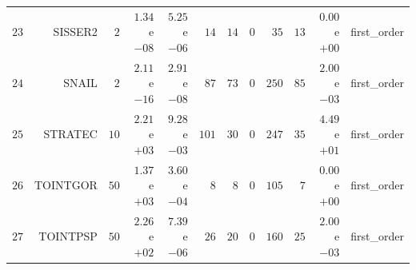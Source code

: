 \begin{longtable}{rrrrrrrrrrrr}
  \(    23\) & SISSER2 & \(     2\) & \( 1.34\)e\(-08\) & \( 5.25\)e\(-06\) & \(    14\) & \(    14\) & \(     0\) & \(    35\) & \(    13\) & \( 0.00\)e\(+00\) & first\_order \\
  \(    24\) & SNAIL & \(     2\) & \( 2.11\)e\(-16\) & \( 2.91\)e\(-08\) & \(    87\) & \(    73\) & \(     0\) & \(   250\) & \(    85\) & \( 2.00\)e\(-03\) & first\_order \\
  \(    25\) & STRATEC & \(    10\) & \( 2.21\)e\(+03\) & \( 9.28\)e\(-03\) & \(   101\) & \(    30\) & \(     0\) & \(   247\) & \(    35\) & \( 4.49\)e\(+01\) & first\_order \\
  \(    26\) & TOINTGOR & \(    50\) & \( 1.37\)e\(+03\) & \( 3.60\)e\(-04\) & \(     8\) & \(     8\) & \(     0\) & \(   105\) & \(     7\) & \( 0.00\)e\(+00\) & first\_order \\
  \(    27\) & TOINTPSP & \(    50\) & \( 2.26\)e\(+02\) & \( 7.39\)e\(-06\) & \(    26\) & \(    20\) & \(     0\) & \(   160\) & \(    25\) & \( 2.00\)e\(-03\) & first\_order \\\hline
\end{longtable}
